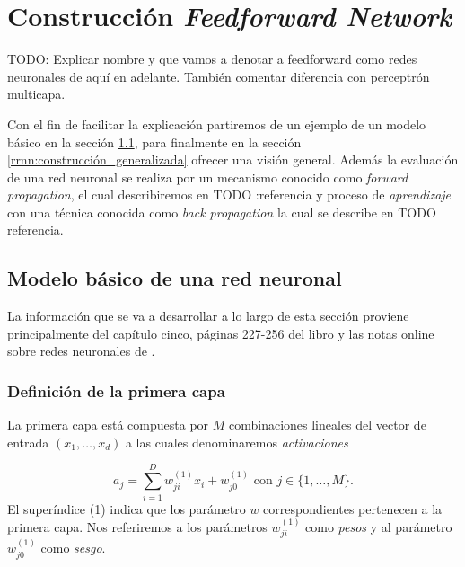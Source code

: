%
\section{Construcción \textit{Feedforward Network}}

TODO: Explicar nombre y que vamos a denotar a feedforward como redes neuronales de aquí en adelante. También comentar diferencia con perceptrón multicapa. 

Con el fin de facilitar la explicación partiremos de un ejemplo de un modelo básico en la sección \ref{rrnn:modelo_simple_rrnn}, para finalmente en la sección \ref{rrnn:construcción_generalizada} ofrecer una visión general. Además la evaluación de una red neuronal se realiza por un mecanismo conocido como \textit{forward propagation}, el cual 
describiremos en TODO :referencia y proceso de \textit{ aprendizaje} con una técnica conocida como \textit{back propagation} la cual se describe en TODO referencia. 

\subsection{Modelo básico de una red neuronal} \label{rrnn:modelo_simple_rrnn}
La información que se va a desarrollar a lo largo de esta 
sección proviene principalmente del capítulo cinco, páginas 227-256 del libro \cite{BishopPaterRecognition} y las notas online sobre redes neuronales de \cite{MostafaLearningFromData}.


\subsubsection*{Definición de la primera capa}
La primera capa está compuesta por $M$ combinaciones
lineales del vector de entrada $(x_1, \ldots, x_d)$
a las cuales denominaremos \textit{activaciones}

\begin{equation}
    a_j = \sum_{i=1}^D w_{ji}^{(1)} x_i + w_{j0}^{(1)}
    \text{ con } j \in \{1, \ldots, M \}.
\end{equation}
El superíndice (1) indica que los parámetro $w$ correspondientes pertenecen a la primera capa. 
Nos referiremos a los  parámetros $w_{ji}^{(1)}$ como 
\textit{pesos} y al parámetro $w_{j0}^{(1)}$ como 
\textit{sesgo}.  

